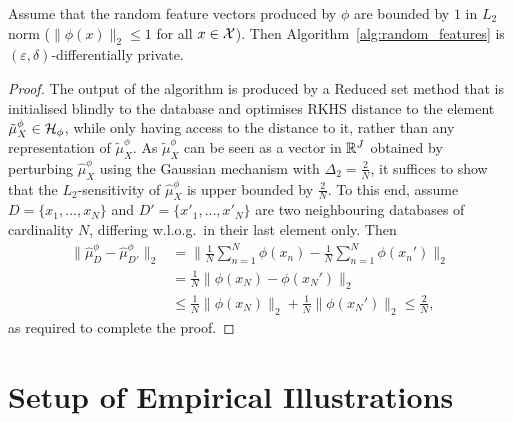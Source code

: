 \begin{hprop}[\ref{prop:random_features_privacy}]
	Assume that the random feature vectors produced by $\phi$ are bounded by $1$ in $L_2$ norm ($\| \phi(x) \|_2 \leq 1$ for all $x \in \mathcal{X}$). Then Algorithm~\ref{alg:random_features} is $(\varepsilon, \delta)$-differentially private.
	\begin{proof}
		The output of the algorithm is produced by a Reduced set method that is initialised blindly to the database and optimises RKHS distance to the element $\tilde{\mu}^{\phi}_X \in \mathcal{H}_{\phi}$, while only having access to the distance to it, rather than any representation of $\tilde{\mu}^{\phi}_X$. As $\tilde{\mu}^{\phi}_X$ can be seen as a vector in $\mathbb{R}^J$ obtained by perturbing $\hat{\mu}^{\phi}_X$ using the Gaussian mechanism with $\Delta_2 = \frac{2}{N}$, it suffices to show that the $L_2$-sensitivity of $\hat{\mu}^{\phi}_X$ is upper bounded by $\frac{2}{N}$. To this end, assume $D = \{ x_1, \ldots, x_N \}$ and $D' = \{ x'_1, \ldots, x'_N \}$ are two neighbouring databases of cardinality $N$, differing w.l.o.g.~in their last element only. Then
		\begin{align}
		\| \hat{\mu}_{D}^{\phi} - \hat{\mu}_{D'}^{\phi} \|_2
		&=
		\Bigg\| \frac{1}{N} \sum_{n = 1}^N \phi(x_n) - \frac{1}{N} \sum_{n = 1}^N \phi(x_n') \Bigg\|_2
		\\&=
		\frac{1}{N} \| \phi(x_N) - \phi(x_N') \|_2
		\\&\leq
		\frac{1}{N} \| \phi(x_N) \|_2 + \frac{1}{N} \| \phi(x_N') \|_2
		\leq
		\frac{2}{N}
		,
		\end{align}
		as required to complete the proof.
	\end{proof}
\end{hprop}



\section{Setup of Empirical Illustrations}
\label{app:sec:experiments}

